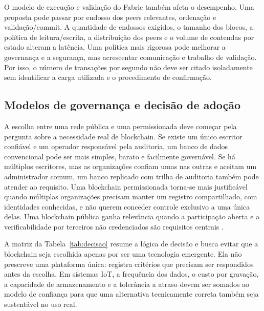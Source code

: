 \documentclass[10pt,a4paper,twocolumn]{article}
\begin{document}
O modelo de execução e validação do Fabric também afeta o desempenho. Uma proposta pode passar por endosso dos peers relevantes, ordenação e validação/commit. A quantidade de endossos exigidos, o tamanho dos blocos, a política de leitura/escrita, a distribuição dos peers e o volume de contendas por estado alteram a latência. Uma política mais rigorosa pode melhorar a governança e a segurança, mas acrescentar comunicação e trabalho de validação. Por isso, o número de transações por segundo não deve ser citado isoladamente sem identificar a carga utilizada e o procedimento de confirmação.

\subsection{Modelos de governança e decisão de adoção}
A escolha entre uma rede pública e uma permissionada deve começar pela pergunta sobre a necessidade real de blockchain. Se existe um único escritor confiável e um operador responsável pela auditoria, um banco de dados convencional pode ser mais simples, barato e facilmente governável. Se há múltiplos escritores, mas as organizações confiam umas nas outras e aceitam um administrador comum, um banco replicado com trilha de auditoria também pode atender ao requisito. Uma blockchain permissionada torna-se mais justificável quando múltiplas organizações precisam manter um registro compartilhado, com identidades conhecidas, e não querem conceder controle exclusivo a uma única delas. Uma blockchain pública ganha relevância quando a participação aberta e a verificabilidade por terceiros não credenciados são requisitos centrais \cite{WuestGervais2018,Yaga2018}.

A matriz da Tabela~\ref{tab:decisao} resume a lógica de decisão e busca evitar que a blockchain seja escolhida apenas por ser uma tecnologia emergente. Ela não prescreve uma plataforma única: registra critérios que precisam ser respondidos antes da escolha. Em sistemas IoT, a frequência dos dados, o custo por gravação, a capacidade de armazenamento e a tolerância a atraso devem ser somados ao modelo de confiança para que uma alternativa tecnicamente correta também seja sustentável no uso real.
\end{document}
